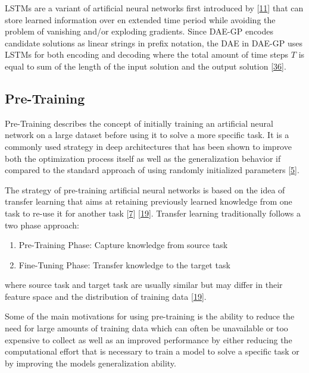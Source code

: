 \documentclass[
  11pt,
]{article}
\providecommand{\tightlist}{%
  \setlength{\itemsep}{0pt}\setlength{\parskip}{0pt}}
\begin{document}
LSTMs are a variant of artificial neural networks first introduced by {[}\protect\hyperlink{ref-lstm_orig}{11}{]} that can store learned information over en extended time period while avoiding the problem of vanishing and/or exploding gradients.
Since DAE-GP encodes candidate solutions as linear strings in prefix notation, the DAE in DAE-GP uses LSTMs for both encoding and decoding where the total amount of time steps \(T\) is equal to sum of the length of the input solution and the output solution {[}\protect\hyperlink{ref-dae-gp_2020_rtree}{36}{]}.

\hypertarget{pre-training}{%
\subsection{Pre-Training}\label{pre-training}}

Pre-Training describes the concept of initially training an artificial neural network on a large dataset before using it to solve a more specific task.
It is a commonly used strategy in deep architectures that has been shown to improve both the optimization process itself as well as the generalization behavior if compared to the standard approach of using randomly initialized parameters {[}\protect\hyperlink{ref-pmlr-v5-erhan09a}{5}{]}.

The strategy of pre-training artificial neural networks is based on the idea of transfer learning that aims at retaining previously learned knowledge from one task to re-use it for another task {[}\protect\hyperlink{ref-HAN2021225}{7}{]} {[}\protect\hyperlink{ref-survey_transfer_learning}{19}{]}.
Transfer learning traditionally follows a two phase approach:

\begin{enumerate}
\def\labelenumi{\arabic{enumi}.}
\tightlist
\item
  Pre-Training Phase: Capture knowledge from source task
\item
  Fine-Tuning Phase: Transfer knowledge to the target task
\end{enumerate}

where source task and target task are usually similar but may differ in their feature space and the distribution of training data {[}\protect\hyperlink{ref-survey_transfer_learning}{19}{]}.

Some of the main motivations for using pre-training is the ability to reduce the need for large amounts of training data which can often be unavailable or too expensive to collect as well as an improved performance by either reducing the computational effort that is necessary to train a model to solve a specific task or by improving the models generalization ability.
\end{document}
